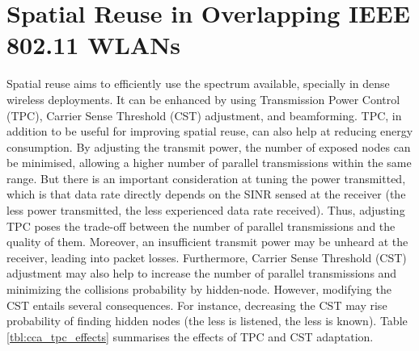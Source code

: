 \documentclass[12pt, a4paper,twoside]{tesi_upf}
\begin{document}
		\section{Spatial Reuse in Overlapping IEEE 802.11 WLANs}
		\label{section:spatial_reuse}	
			Spatial reuse aims to efficiently use the spectrum available, specially in dense wireless deployments. It can be enhanced by using Transmission Power Control (TPC), Carrier Sense Threshold (CST) adjustment, and beamforming. TPC, in addition to be useful for improving spatial reuse, can also help at reducing energy consumption. By adjusting the transmit power, the number of exposed nodes can be minimised, allowing a higher number of parallel transmissions within the same range. But there is an important consideration at tuning the power transmitted, which is that data rate directly depends on the SINR sensed at the receiver (the less power transmitted, the less experienced data rate received). Thus, adjusting TPC poses the trade-off between the number of parallel transmissions and the quality of them. Moreover, an insufficient transmit power may be unheard at the receiver, leading into packet losses. Furthermore, Carrier Sense Threshold (CST) adjustment may also help to increase the number of parallel transmissions and minimizing the collisions probability by hidden-node. However, modifying the CST entails several consequences. For instance, decreasing the CST may rise probability of finding hidden nodes (the less is listened, the less is known). Table \ref{tbl:cca_tpc_effects} summarises the effects of TPC and CST adaptation.			
\end{document}
